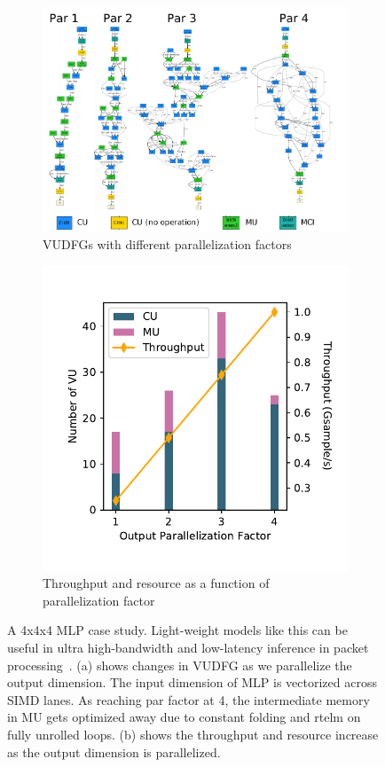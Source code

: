 \begin{figure}
\centering
\begin{subfigure}[b]{0.6\textwidth}
\includegraphics[width=1\textwidth]{figs/mlpunroll.pdf}
\caption{VUDFGs with different parallelization factors}
\end{subfigure}
\hfill
\begin{subfigure}[b]{0.39\textwidth}
\includegraphics[width=1\textwidth]{figs/mlp.pdf}
\caption{Throughput and resource as a function of parallelization factor}
\end{subfigure}
\caption[MLP case study]{
  A 4x4x4 MLP case study. 
  Light-weight models like this can be useful in ultra high-bandwidth and
  low-latency inference in packet processing~\cite{taurus}.
  (a) shows changes in VUDFG as we parallelize the output dimension.
  The input dimension of MLP is vectorized across SIMD lanes.
  As reaching par factor at 4, the intermediate memory in MU gets optimized away due to constant
  folding and rtelm on fully unrolled loops. (b) shows the throughput and resource increase as the
  output dimension is parallelized.
}
\label{fig:mlp}
\end{figure}

